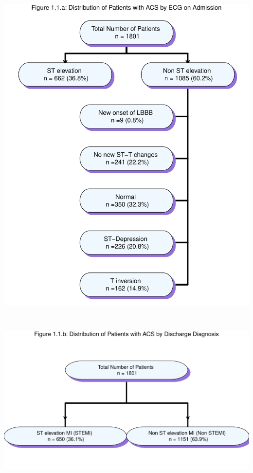 \documentclass[
]{article}
\begin{document}
\includegraphics{‏‏ACSIS_2024_v1_pdf_without_files/figure-latex/unnamed-chunk-6-1.pdf}

\pagebreak

~

\includegraphics{‏‏ACSIS_2024_v1_pdf_without_files/figure-latex/unnamed-chunk-7-1.pdf}

\pagebreak

~
\end{document}
